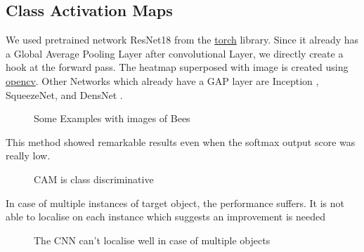 \subsection{Class Activation Maps}
We used pretrained network ResNet18 \cite{ResNet} from the \href{https://pytorch.org/}{torch} library. 
Since it already has a Global Average Pooling Layer after convolutional Layer, we directly create a hook at the forward pass. The heatmap superposed with image is created using \href{https://opencv.org/}{opencv}.
Other Networks which already have a GAP layer are Inception \cite{Inception}, SqueezeNet\cite{SqueezeNet}, and DensNet \cite{DensNet}.\\

\begin{figure}[H]
    \centering
    \qquad
    \caption[Short text]{Some Examples with images of Bees}
    \label{fig:Some_Examples}
\end{figure}
This method showed remarkable results even when the softmax output score was really low. \\

\begin{figure}[H]
    \centering
    \qquad
    \qquad
    \qquad
    \caption[Short text]{CAM is class discriminative}
    \label{fig:Defi}
\end{figure}

In case of multiple instances of target object, the performance suffers. It is not able to localise on each instance which suggests an improvement is needed

\begin{figure}[H]
    \centering
    \qquad
    \caption[Short text]{The CNN can't localise well in case of multiple objects}
    \label{fig:Defi}
\end{figure}

